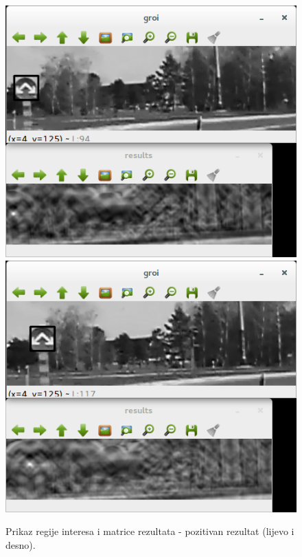 \begin{figure}[!htb]
    \includegraphics[width=\linewidth]{figures/10.png}
\endminipage\hfill
{}
    \includegraphics[width=\linewidth]{figures/11.png}
\endminipage\hfill
\caption{Prikaz regije interesa i matrice rezultata - pozitivan rezultat
 (lijevo i desno).}
\label{fig:obz2}
\end{figure}

